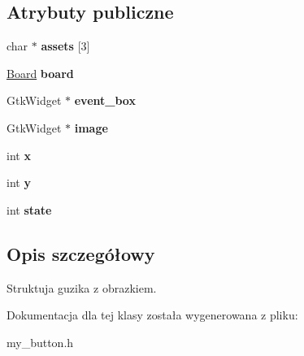 \subsection*{Atrybuty publiczne}
\begin{DoxyCompactItemize}
\item 
char $\ast$ {\bfseries assets} \mbox{[}3\mbox{]}\hypertarget{structmy__button_a3a9778fafcb88866f6a084aac82055a2}{}\label{structmy__button_a3a9778fafcb88866f6a084aac82055a2}

\item 
\hyperlink{structboard}{Board} {\bfseries board}\hypertarget{structmy__button_a696a9280a90d1b7f2bb041832c1eafe4}{}\label{structmy__button_a696a9280a90d1b7f2bb041832c1eafe4}

\item 
Gtk\+Widget $\ast$ {\bfseries event\+\_\+box}\hypertarget{structmy__button_a30176d0d65c9e03e19d912bce69b3240}{}\label{structmy__button_a30176d0d65c9e03e19d912bce69b3240}

\item 
Gtk\+Widget $\ast$ {\bfseries image}\hypertarget{structmy__button_ac0d07c21d699515ebf2626fa6e7ede47}{}\label{structmy__button_ac0d07c21d699515ebf2626fa6e7ede47}

\item 
int {\bfseries x}\hypertarget{structmy__button_a6bd896eb399fe422ae03e4f2eaad53af}{}\label{structmy__button_a6bd896eb399fe422ae03e4f2eaad53af}

\item 
int {\bfseries y}\hypertarget{structmy__button_a32323eb674397182f5ec463ef52fef83}{}\label{structmy__button_a32323eb674397182f5ec463ef52fef83}

\item 
int {\bfseries state}\hypertarget{structmy__button_ade000e7dc35bbfbc7def62c34fe731a3}{}\label{structmy__button_ade000e7dc35bbfbc7def62c34fe731a3}

\end{DoxyCompactItemize}


\subsection{Opis szczegółowy}
Struktuja guzika z obrazkiem. 

Dokumentacja dla tej klasy została wygenerowana z pliku\+:\begin{DoxyCompactItemize}
\item 
my\+\_\+button.\+h\end{DoxyCompactItemize}
